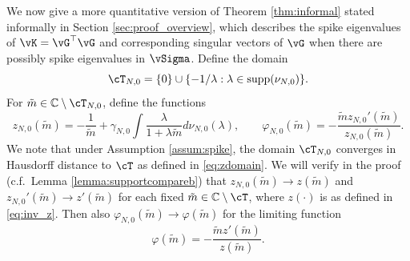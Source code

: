 We now give a more quantitative version of Theorem \ref{thm:informal} stated
informally in Section \ref{sec:proof_overview}, which describes the
spike eigenvalues of $\vK=\vG^\top \vG$ and corresponding singular vectors of $\vG$ when
there are possibly spike eigenvalues in $\vSigma$. Define the domain
\[\cT_{N,0}=\{0\} \cup \{-1/\lambda:\lambda \in \supp{\nu_{N,0}}\}.\]
For $\tilde m \in \C \setminus \cT_{N,0}$, define the functions
\begin{equation}\label{eq:zN0}
z_{N,0}(\tilde m)=-\frac{1}{\tilde m}+\gamma_{N,0}
\int \frac{\lambda}{1+\lambda \tilde m}d\nu_{N,0}(\lambda), \qquad
\varphi_{N,0}(\tilde m)={-}\frac{\tilde m z_{N,0}'(\tilde m)}{z_{N,0}(\tilde m)}.
\end{equation}
We note that under Assumption \ref{assum:spike}, the domain $\cT_{N,0}$
converges in Hausdorff distance to $\cT$ as defined in \eqref{eq:zdomain}.
We will verify in the proof (c.f.\ Lemma \ref{lemma:supportcompareb})
that $z_{N,0}(\tilde m) \to z(\tilde m)$ 
and $z_{N,0}'(\tilde m) \to z'(\tilde m)$ for each fixed
$\tilde m \in \C \setminus \cT$,
where $z(\cdot)$ is as defined in \eqref{eq:inv_z}. Then also
$\varphi_{N,0}(\tilde m) \to \varphi(\tilde m)$ for the limiting function
\begin{equation}\label{eq:phi_limit}
\varphi(\tilde m)={-}\frac{\tilde m z'(\tilde m)}{z(\tilde m)}.
\end{equation}

